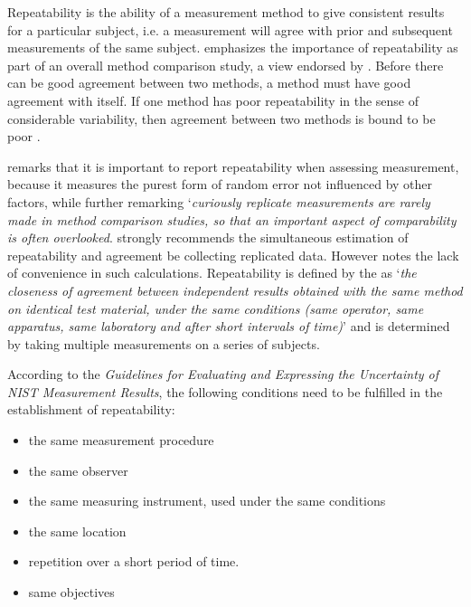 \documentclass[12pt, a4paper]{report}
\theoremstyle{plain}
\theoremstyle{definition}
\theoremstyle{remark}
\begin{document}
	
	
	
	



	
	Repeatability is the ability of a measurement method to give consistent results for a particular subject, i.e. a measurement will agree with prior and subsequent measurements of the same subject. \citet{Barnhart} emphasizes the importance of repeatability as part of an overall method comparison study, a view endorsed by \citet{BXC2008}. Before there can be good agreement between two methods, a method must have good agreement with itself. If one method has poor repeatability in the sense of considerable
	variability, then agreement between two methods is bound to be
	poor \citep{ARoy2009}. 
	
	
	\citet{Barnhart} remarks that it is important to report repeatability when assessing
	measurement, because it measures the purest form of random error
	not influenced by other factors, while further remarking `\textit{curiously replicate measurements are rarely made in method comparison studies, so that an important aspect of comparability is often overlooked}. \citet{BA99} strongly recommends the simultaneous estimation of repeatability and agreement be collecting replicated data.
	However \citet{ARoy2009} notes the lack of convenience in such calculations. 	Repeatability is defined by the \citet{IUPAC} as `\textit{the closeness of agreement between independent results obtained with the same method on identical test material, under the same conditions (same
		operator, same apparatus, same laboratory and after short intervals of time)}'  and is determined by taking multiple measurements on a series of subjects.
	
	According to the \textit{Guidelines for Evaluating and Expressing the Uncertainty of NIST Measurement Results}, the following conditions need to be fulfilled in the establishment of repeatability:
	\begin{itemize}
		\item	the same measurement procedure
		\item	the same observer
		\item	the same measuring instrument, used under the same conditions
		\item	the same location
		\item	repetition over a short period of time.
		\item  same objectives
	\end{itemize}
	
\end{document}
